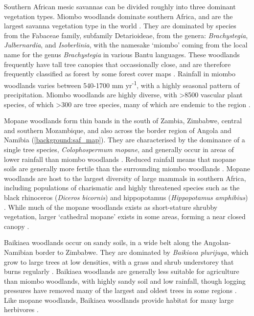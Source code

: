 \begin{refsection}
Southern African mesic savannas can be divided roughly into three dominant vegetation types. Miombo woodlands dominate southern Africa, and are the largest savanna vegetation type in the world \citep{Ryan2011}. They are dominated by species from the Fabaceae family, subfamily Detarioideae, from the genera: \textit{Brachystegia}, \textit{Julbernardia}, and \textit{Isoberlinia}, with the namesake `miombo' coming from the local name for the genus \textit{Brachystegia} in various Bantu languages. These woodlands frequently have tall tree canopies that occassionally close, and are therefore frequently classified as forest by some forest cover maps \citep{Hansen2013}. Rainfall in miombo woodlands varies between 540-1700 mm yr\textsuperscript{-1}, with a highly seasonal pattern of precipitation. Miombo woodlands are highly diverse, with >8500 vascular plant species, of which >300 are tree species, many of which are endemic to the region \citep{Frost1996}.

Mopane woodlands form thin bands in the south of Zambia, Zimbabwe, central and southern Mozambique, and also across the border region of Angola and Namibia (\autoref{background:saf_map}). They are characterised by the dominance of a single tree species, \textit{Colophospermum mopane}, and generally occur in areas of lower rainfall than miombo woodlands \citep{Palgrave2003}. Reduced rainfall means that mopane soils are generally more fertile than the surrounding miombo woodlands \citep{Makhado2014}. Mopane woodlands are host to the largest diversity of large mammals in southern Africa, including populations of charismatic and highly threatened species such as the black rhinoceros (\textit{Diceros bicornis}) and hippopotamus (\textit{Hippopotamus amphibius}) \citep{Mittermeier2003}. While much of the mopane woodlands exists as short-stature shrubby vegetation, larger `cathedral mopane' exists in some areas, forming a near closed canopy \citep{Makhado2014}.

Baikiaea woodlands occur on sandy soils, in a wide belt along the Angolan-Namibian border to Zimbabwe. They are dominated by \textit{Baikiaea plurijuga}, which grow to large trees at low densities, with a grass and shrub understorey that burns regularly \citep{Werger1978}. Baikiaea woodlands are generally less suitable for agriculture than miombo woodlands, with highly sandy soil and low rainfall, though logging pressures have removed many of the largest and oldest trees in some regions \citep{}. Like mopane woodlands, Baikiaea woodlands provide habitat for many large herbivores \citep{}.



\end{refsection}
